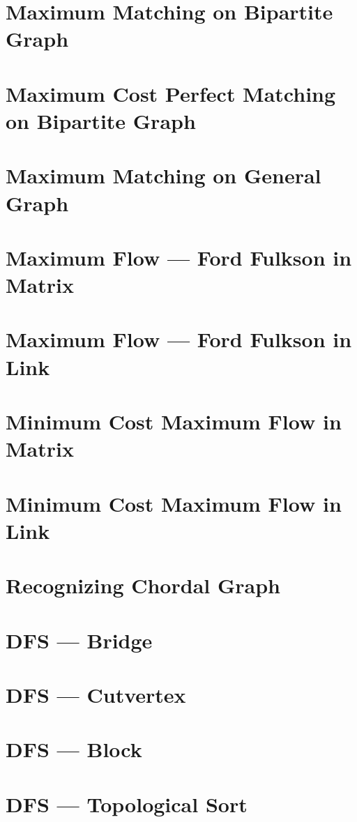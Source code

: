 \documentclass{report}
\begin{document}
\begin{CJK*}{GBK}{kai}
\section{Maximum Matching on Bipartite Graph}

\clearpage
\section{Maximum Cost Perfect Matching on Bipartite Graph}

\section{Maximum Matching on General Graph}

\section{Maximum Flow --- Ford Fulkson in Matrix}

\clearpage
\section{Maximum Flow --- Ford Fulkson in Link}

\clearpage
\section{Minimum Cost Maximum Flow in Matrix}

\clearpage
\section{Minimum Cost Maximum Flow in Link}

\section{Recognizing Chordal Graph}

\clearpage
\section{DFS --- Bridge}

\section{DFS --- Cutvertex}

\clearpage
\section{DFS --- Block}

\clearpage
\section{DFS --- Topological Sort}


\end{CJK*}
\end{document}
